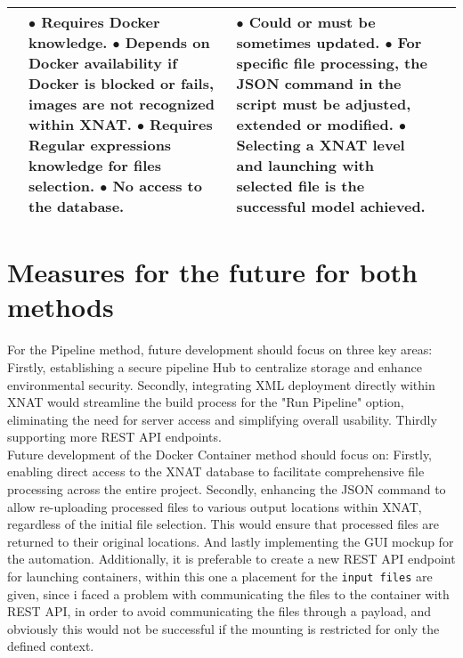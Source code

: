 \begin{table}[htbp]
\begin{tabular}{|p{1cm}|p{3cm}|p{5cm}|p{4cm}|}
{}
&
\parbox[t]{6cm}{
$\bullet$ Requires Docker knowledge. \\
$\bullet$ Depends on Docker availability \\if Docker is blocked or fails, \\images are not recognized\\ within XNAT. \\
$\bullet$ Requires Regular expressions\\ knowledge for files selection. \\
$\bullet$ No access to the database. \\

}
&
\parbox[t]{4cm}{
$\bullet$ Could or must be sometimes updated.\\
$\bullet$ For specific file processing, the JSON command in the script must be adjusted, extended or modified.\\
$\bullet$ Selecting a XNAT level and launching with selected file is the successful model achieved. 
} \\
\hline
\end{tabular}
\label{tab:docker_pipeline}
\end{table}


\section{Measures for the future for both methods}

For the Pipeline method, future development should focus on three key areas: Firstly, establishing a secure pipeline Hub to centralize storage and enhance environmental security. Secondly, integrating XML deployment directly within XNAT would streamline the build process for the "Run Pipeline" option, eliminating the need for server access and simplifying overall usability. Thirdly supporting more REST API endpoints.\\
Future development of the Docker Container method should focus on: Firstly, enabling direct access to the XNAT database to facilitate comprehensive file processing across the entire project. Secondly, enhancing the JSON command to allow re-uploading processed files to various output locations within XNAT, regardless of the initial file selection. This would ensure that processed files are returned to their original locations. And lastly implementing the GUI mockup for the automation.
Additionally, it is preferable to create a new REST API endpoint for launching containers, within this one a placement for the \texttt{input files} are given, since i faced a problem with communicating the files to the container with REST API, in order to avoid communicating the files through a payload, and obviously this would not be successful if the mounting is restricted for only the defined context. 

